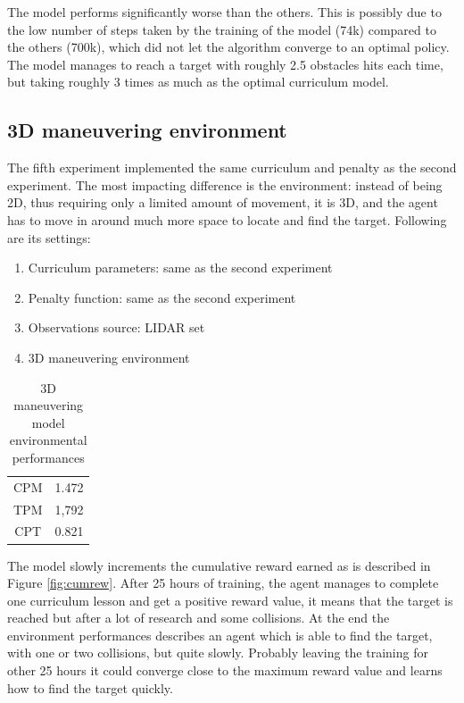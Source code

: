 \documentclass{ifacconf}
\begin{document}
The model performs significantly worse than the others. This is possibly due to the low number of steps taken by the training of the model (74k) compared to the others (700k), which did not let the algorithm converge to an optimal policy. The model manages to reach a target with roughly 2.5 obstacles hits each time, but taking roughly 3 times as much as the optimal curriculum model.

\subsection{3D maneuvering environment}
The fifth experiment implemented the same curriculum and penalty as the second experiment. The most impacting difference is the environment: instead of being 2D, thus requiring only a limited amount of movement, it is 3D, and the agent has to move in around much more space to locate and find the target.
Following are its settings:
\begin{enumerate}
    \item Curriculum parameters: same as the second experiment
    \item Penalty function: same as the second experiment
    \item Observations source: LIDAR set
    \item 3D maneuvering environment
\end{enumerate}

\begin{table}[ht]
\centering
\caption{3D maneuvering model environmental performances}
\label{tab:3d}
\begin{tabular}[t]{cc}
\hline
CPM&1.472\\
TPM&1,792\\
CPT&0.821\\
\hline
\end{tabular}
\end{table}%

The model slowly increments the cumulative reward earned as is described in Figure \ref{fig:cumrew}. After 25 hours of training, the agent manages to complete one curriculum lesson and get a positive reward value, it means that the target is reached but after a lot of research and some collisions. At the end the environment performances describes an agent which is able to find the target, with one or two collisions, but quite slowly. Probably leaving the training for other 25 hours it could converge close to the maximum reward value and learns how to find the target quickly.
\end{document}
